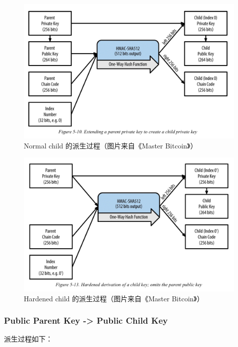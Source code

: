 \begin{figure}[h]
\centering
\includegraphics[width=\textwidth]{./CKDpriv.png}
\caption{Normal child 的派生过程（图片来自《Master Bitcoin》）}\label{fig-parsesig}
\end{figure}


\begin{figure}[h]
\centering
\includegraphics[width=\textwidth]{./CKDpriv2.png}
\caption{Hardened child 的派生过程（图片来自《Master Bitcoin》）}\label{fig-parsesig}
\end{figure}




\subsubsection{Public Parent Key -> Public Child Key}
派生过程如下：

